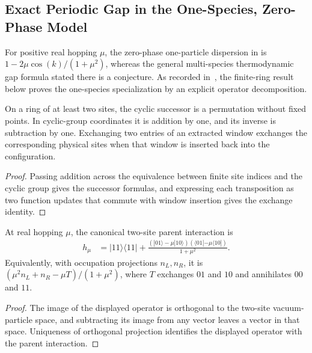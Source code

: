 \subsection{Exact Periodic Gap in the One-Species, Zero-Phase Model}
\label{sec:pvbs_periodic_gap}

For positive real hopping $\mu$, the zero-phase one-particle dispersion in
\cite[Section~II, after equation~(8)]{BachmannNachtergaele2012PVBS} is
$1-2\mu\cos(k)/(1+\mu^2)$, whereas the general multi-species thermodynamic
gap formula stated there is a conjecture. As recorded
in~\cite{gap:bn12_pvbs_periodic_gap}, the finite-ring result below proves the
one-species specialization by an explicit operator decomposition.

\begin{lemma}
    \label{lem:pvbs_cyclic_geometry}
    \leanok
    On a ring of at least two sites, the cyclic successor is a permutation
    without fixed points. In cyclic-group coordinates it is addition by
    one, and its inverse is subtraction by one. Exchanging two entries
    of an extracted window exchanges the corresponding physical sites
    when that window is inserted back into the configuration.
\end{lemma}
\begin{proof}
    \leanok
    Passing addition across the equivalence between finite site indices and
    the cyclic group gives the successor formulas, and expressing each
    transposition as two function updates that commute with window insertion
    gives the exchange identity.
\end{proof}

\begin{lemma}
    \label{lem:pvbs_local_projector}
    \leanok
    At real hopping $\mu$, the canonical two-site parent interaction is
    \begin{align}
        h_\mu & =|11\rangle\langle11|+
        \frac{(|01\rangle-\mu|10\rangle)
            (\langle01|-\mu\langle10|)}{1+\mu^2}.
        \label{eq:pvbs_normalized_interaction}
    \end{align}
    Equivalently, with occupation projections $n_L,n_R$, it is
    $(\mu^2n_L+n_R-\mu T)/(1+\mu^2)$, where $T$ exchanges $01$ and $10$
    and annihilates $00$ and $11$.
\end{lemma}
\begin{proof}
    \leanok
    The image of the displayed operator is orthogonal to the two-site
    vacuum-particle space, and subtracting its image from any vector leaves
    a vector in that space. Uniqueness of orthogonal projection identifies
    the displayed operator with the parent interaction.
\end{proof}

